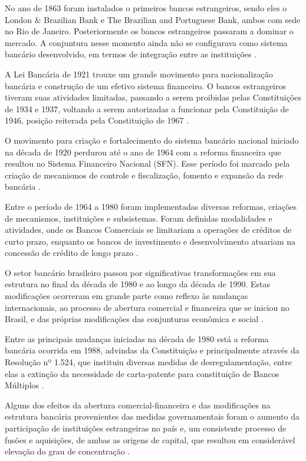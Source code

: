 \documentclass[
  12pt,
  12pt,
  openright,
  oneside,
  a4paper,
  chapter=TITLE,
  section=TITLE,
  subsection=TITLE,
  subsubsection=TITLE,
  english,
  portugues,
  sumario=tradicional]{abntex2}
\begin{document}
No ano de 1863 foram instalados o primeiros bancos estrangeiros, sendo eles o London \& Brazilian Bank e The Brazilian and Portuguese Bank, ambos com sede no Rio de Janeiro. Posteriormente os bancos estrangeiros passaram a dominar o mercado. A conjuntura nesse momento ainda não se configurava como sistema bancário desenvolvido, em termos de integração entre as instituições \cite{camargo:2009, guimaraes:2011, mendes:2014}.

A Lei Bancária de 1921 trouxe um grande movimento para nacionalização bancária e construção de um efetivo sistema financeiro. O bancos estrangeiros tiveram suas atividades limitadas, passando a serem proibidas pelas Constituições de 1934 e 1937, voltando a serem autorizadas a funcionar pela Constituição de 1946, posição reiterada pela Constituição de 1967 \cite{camargo:2009, decreto:1921, guimaraes:2011}.

O movimento para criação e fortalecimento do sistema bancário nacional iniciado na década de 1920 perdurou até o ano de 1964 com a reforma financeira que resultou no Sistema Financeiro Nacional (SFN). Esse período foi marcado pela criação de mecanismos de controle e fiscalização, fomento e expansão da rede bancária \cite{camargo:2009, guimaraes:2011}.

Entre o período de 1964 a 1980 foram implementadas diversas reformas, criações de mecanismos, instituições e subsistemas. Foram definidas modalidades e atividades, onde os Bancos Comerciais se limitariam a operações de créditos de curto prazo, enquanto os bancos de investimento e desenvolvimento atuariam na concessão de crédito de longo prazo \cite{camargo:2009}.

O setor bancário brasileiro passou por significativas transformações em sua estrutura no final da década de 1980 e ao longo da década de 1990. Estas modificações ocorreram em grande parte como reflexo às mudanças internacionais, ao processo de abertura comercial e financeira que se iniciou no Brasil, e das próprias modificações das conjunturas econômica e social \cite{camargo:2009}.

Entre as principais mudanças iniciadas na década de 1980 está a reforma bancária ocorrida em 1988, advindas da Constituição e principalmente através da Resolução nº 1.524, que instituiu diversas medidas de desregulamentação, entre elas a extinção da necessidade de carta-patente para constituição de Bancos Múltiplos \cite{Res:1524:1988}.

Alguns dos efeitos da abertura comercial-financeira e das modificações na estrutura bancária provenientes das medidas governamentais foram o aumento da participação de instituições estrangeiras no país e, um consistente processo de fusões e aquisições, de ambas as origens de capital, que resultou em considerável elevação do grau de concentração \cite{camargo:2009}.
\end{document}
